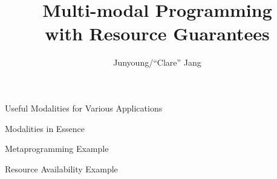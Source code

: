 \documentclass[letterpaper,12pt,aspectratio=169,show notes]{beamer}
\title{Multi-modal Programming\\with Resource Guarantees}
\date{}
\author[C. Jang]{Junyoung/``Clare'' Jang}
\begin{document}
\begin{frame}
  \titlepage
\end{frame}

\begin{frame}[fragile]{Useful Modalities for Various Applications}
  \begin{tikzpicture}[fulloverlay]
	
  \end{tikzpicture}
\end{frame}

\begin{frame}{Modalities in Essence}
\end{frame}

\begin{frame}{Metaprogramming Example}
  
\end{frame}

\begin{frame}{Resource Availability Example}
  
\end{frame}
\end{document}
